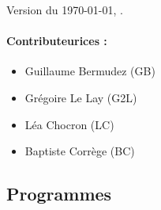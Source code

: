 \maketitle

\frontmatter


\thispagestyle{empty}

Version du \today, \xxivtime.

\vfill

\paragraph{Contributeurices :}
\begin{itemize}
    \item Guillaume Bermudez (GB)
    \item Grégoire Le Lay (G2L)
    \item Léa Chocron (LC)
    \item Baptiste Corrège (BC)
\end{itemize}

\pagebreak

\subsection*{Programmes}


